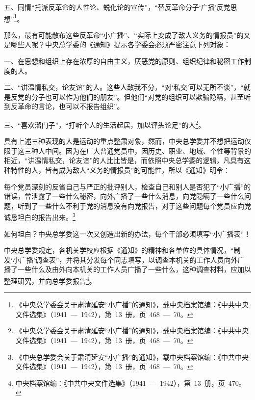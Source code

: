 五、同情“托派反革命的人性论、蜕化论的宣传”，“替反革命分子‘广播’反党思想”\footnote{《中央总学委会关于肃清延安“小广播”的通知》，载中央档案馆编：《中共中央文件选集》（1941~—~1942），第~13~册，页~468~—~70。}。

那么，最有可能散布这些反革命“小广播”、“实际上变成了敌人义务的情报员”的又是哪些人呢？中央总学委的《通知》提示各学委会必须严密注意下列对象：

一、在思想和组织上存在浓厚的自由主义，厌恶党的原则、组织纪律和秘密工作制度的人。

二、“讲温情私交，论友谊”的人。这些人敌我不分，“对‘私交’可以无所不谈”，“就是反党的分子也可以作为他们的朋友”。但他们“对党的组织可以欺骗隐瞒，甚至听到反革命的言论，也可以不报告组织”。

三、“喜欢溜门子”，“打听个人的生活起居，加以评头论足”的人\footnote{《中央总学委会关于肃清延安“小广播”的通知》，载中央档案馆编：《中共中央文件选集》（1941~—~1942），第~13~册，页~468~—~70。}。

具有上述三种表现的人是运动的重点整肃对象，然而，中央总学委并不想把运动仅限于这三种人中间。因为在广大普通党员中，因历史、职业、地域、个性等背景的相近，“讲温情私交，论友谊”的人比比皆是，而依照中央总学委的逻辑，凡具有这种特性的人，皆有成为敌人“义务的情报员”的可能性，所以《通知》明令：

\begin{quoting}
每个党员深刻的反省自己与严正的批评别人，检查自己和别人是否犯了“小广播”的错误，曾泄露了一些什么秘密，向外广播了一些什么消息，向党隐瞒了一些什么问题，听到了一些什么不利于党的消息没有向党报告，对于这些问题每个党员应向党诚恳坦白的报告出来。\footnote{《中央总学委会关于肃清延安“小广播”的通知》，载中央档案馆编：《中共中央文件选集》（1941~—~1942），第~13~册，页~468~—~70。}
\end{quoting}

如何坦白？中央总学委这一次又创造出新的办法，每个干部必须填写“小广播表”！

中央总学委规定，各机关学校应根据《通知》的精神和各单位的具体情况，“制发‘小广播’调查表”，并将其分发每个同志填写，以调查本机关的工作人员向外广播了一些什么及由外向本机关的工作人员广播了一些什么，这种调查材料，应加以整理研究，并向总学委报告\footnote{中央档案馆编：《中共中央文件选集》（1941~—~1942），第~13~册，页~470。}。

